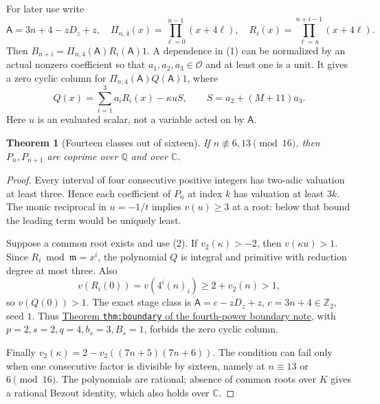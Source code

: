 \documentclass[11pt]{article}
\newtheorem{theorem}{Theorem}
\begin{document}
For later use write
\[
 \mathsf A=3n+4-zD_z+z,\quad
 \Pi_{n,4}(x)=\prod_{\ell=0}^{n-1}(x+4\ell),\quad
 R_i(x)=\prod_{\ell=n}^{n+i-1}(x+4\ell).
\]
Then $B_{n+i}=\Pi_{n,4}(\mathsf A)R_i(\mathsf A)1$.
A dependence in (1) can be normalized by an actual nonzero
coefficient so that $a_1,a_2,a_3\in\mathcal O$ and at least one is a unit.
It gives a zero cyclic column for $\Pi_{n,4}(\mathsf A)Q(\mathsf A)1$,
where
\[
 Q(x)=\sum_{i=1}^3a_iR_i(x)-\kappa uS,\qquad
 S=a_2+(M+11)a_3.                                    \tag{2}
\]
Here $u$ is an evaluated scalar, not a variable acted on by
$\mathsf A$.

\begin{theorem}[Fourteen classes out of sixteen]
\label{thm:fourteen-sixteenths}
If $n\not\equiv6,13\pmod{16}$, then $P_n,P_{n+1}$ are coprime
over $\mathbb Q$ and over $\mathbb C$.
\end{theorem}
\begin{proof}
Every interval of four consecutive positive integers has
two-adic valuation at least three. Hence each coefficient of
$P_n$ at index $k$ has valuation at least $3k$.
The monic reciprocal in $u=-1/t$ implies $v(u)\ge3$
at a root: below that bound the leading term would be uniquely least.

Suppose a common root exists and use (2).
If $v_2(\kappa)>-2$, then $v(\kappa u)>1$.
Since $R_i\bmod\mathfrak m=x^i$,
the polynomial $Q$ is integral and primitive with reduction degree
at most three. Also
\[
 v(R_i(0))=v(4^i(n)_i)\ge2+v_2(n)>1,
\]
so $v(Q(0))>1$.
The exact stage class is
$\mathsf A=c-zD_z+z$, $c=3n+4\in\mathbb Z_2$, seed $1$.
Thus \href{LOWER_TWO_FOURTH_POWER_GAP_SFC.tex}{Theorem
\texttt{thm:boundary} of the fourth-power boundary note},
with $p=2,s=2,q=4,b_s=3,B_s=1$, forbids the zero cyclic column.

Finally
$v_2(\kappa)=2-v_2((7n+5)(7n+6))$.
The condition can fail only when one consecutive factor is
divisible by sixteen, namely at $n\equiv13$ or $6\pmod{16}$.
The polynomials are rational; absence of common roots over $K$
gives a rational Bezout identity, which also holds over $\mathbb C$.
\end{proof}
\end{document}
